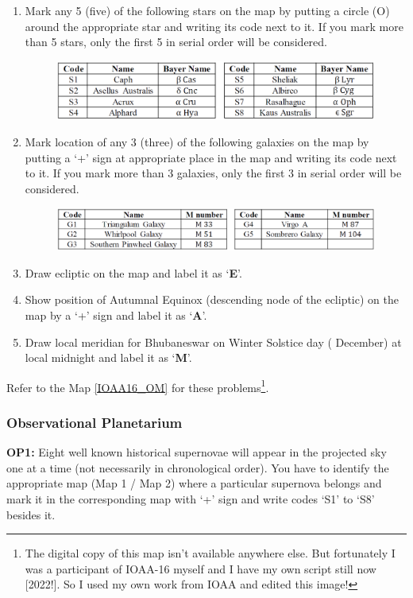 \documentclass[a4paper,12pt]{extarticle}
\begin{document}
\begin{enumerate}
    \item Mark any 5 (five) of the following stars on the map by putting a circle (O) around the appropriate star and writing its code next to it. If you mark more than 5 stars, only the first 5 in serial order will be considered.
    \begin{figure}[H]
    \centering
    \includegraphics[width=0.9\linewidth]{2016_T1.PNG}
\end{figure}
    \item  Mark location of any 3 (three) of the following galaxies on the map by putting a ‘+’ sign at appropriate place in the map and writing its code next to it. If you mark more than 3 galaxies, only the first 3 in serial order will be considered.
        \begin{figure}[H]
    \centering
    \includegraphics[width=0.9\linewidth]{2016_T2.PNG}
\end{figure}
\item Draw ecliptic on the map and label it as ‘\textbf{E}’.
\item Show position of Autumnal Equinox (descending node of the ecliptic) on the map by a ‘+’ sign and label it as ‘\textbf{A}’.
\item Draw local meridian for Bhubaneswar on Winter Solstice day ( December) at local midnight and label it as ‘\textbf{M}’.
\end{enumerate}

Refer to the Map \ref{IOAA16_OM} for these problems\footnote{The digital copy of this map isn't available anywhere else. But fortunately I was a participant of IOAA-16 myself and I have my own script still now [2022!]. So I used my own work from IOAA and edited this image!}. 

\subsubsection{Observational Planetarium}

\textbf{OP1:} Eight well known historical supernovae will appear in the projected sky one at a time (not necessarily in chronological order). You have to identify the appropriate map (Map 1 / Map 2) where a particular supernova belongs and mark it in the corresponding map with ‘+’ sign and write codes ‘S1’ to ‘S8’ besides it.\\
\clearpage
\end{document}
